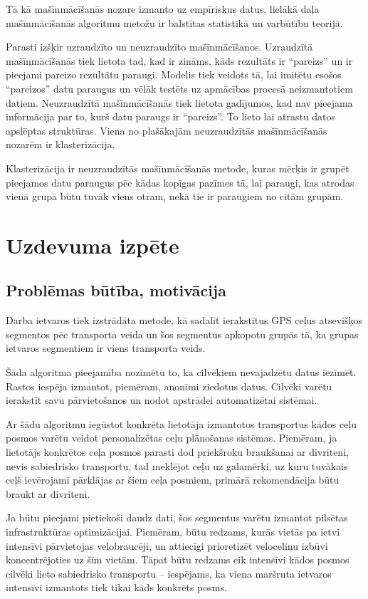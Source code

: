 \documentclass{ludis}
\begin{document}
Tā kā mašīnmācīšanās nozare izmanto uz empīriskus datus, lielākā daļa mašīnmācīšanās
algoritmu metožu ir balstītas statistikā un varbūtību teorijā. 

Parasti izšķir uzraudzīto un neuzraudzīto mašīnmācīšanos. Uzraudzītā mašīnmācīšanās tiek lietota
tad, kad ir zināms, kāds rezultāts ir ``pareizs'' un ir pieejami pareizo rezultātu paraugi.
Modelis tiek veidots tā, lai imitētu esošos ``pareizos'' datu paraugus un vēlāk testēts uz 
apmācības procesā neizmantotiem datiem. Neuzraudzītā mašīnmācīšanās tiek lietota gadījumos, kad
nav pieejama informācija par to, kurš datu paraugs ir ``pareizs''. To lieto lai atrastu datos
apslēptas struktūras. Viena no plašākajām neuzraudzītās mašīnmācīšanās nozarēm ir klasterizācija.

Klasterizācija ir neuzraudzītās mašīnmācīšanās metode, kuras mērķis ir grupēt pieejamos datu
paraugus pēc kādas kopīgas pazīmes tā, lai paraugi, kas atrodas vienā grupā būtu tuvāk viens otram,
nekā tie ir paraugiem no citām grupām. 

\chapter{Uzdevuma izpēte}
\section{Problēmas būtība, motivācija}
Darba ietvaros tiek izstrādāta metode, kā sadalīt ierakstītus GPS ceļus atsevišķos segmentos
pēc transporta veida un šos segmentus apkopotu grupās tā, ka grupas ietvaros segmentiem ir viens
transporta veids.

Šāda algoritma pieejamība nozīmētu to, ka cilvēkiem nevajadzētu datus iezīmēt. Rastos iespēja
izmantot, piemēram, anonīmi ziedotus datus. Cilvēki varētu ierakstīt savu pārvietošanos
un nodot apstrādei automatizētai sistēmai.

Ar šādu algoritmu iegūstot konkrēta lietotāja izmantotos transportus kādos ceļu posmos varētu veidot
personalizētas ceļu plānošanas sistēmas. Piemēram, ja lietotājs konkrētos ceļa posmos parasti
dod priekšroku braukšanai ar divriteni, nevis sabiedrisko transportu, tad meklējot ceļu uz galamērķi,
uz kuru tuvākais ceļš ievērojami pārklājas ar šiem ceļa posmiem, primārā rekomendācija būtu
braukt ar divriteni.

Ja būtu pieejami pietiekoši daudz dati, šos segmentus varētu izmantot pilsētas infrastruktūras
optimizācijai. Piemēram, būtu redzams, kurās vietās pa ietvi intensīvi pārvietojas velobraucēji,
un attiecīgi prioretizēt veloceliņu izbūvi koncentrējoties uz šīm vietām. Tāpat būtu redzams cik
intensīvi kādos posmos cilvēki lieto sabiedrisko transportu -- iespējams, ka viena maršruta ietvaros
intensīvi izmantots tiek tikai kāds konkrēts posms.
\end{document}
